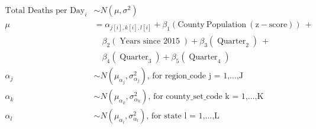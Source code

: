 $$
\begin{aligned}
  \operatorname{Total\ Deaths\ per\ Day}_{i}  &\sim N \left(\mu, \sigma^2 \right) \\
    \mu &=\alpha_{j[i],k[i],l[i]} + \beta_{1}(\operatorname{County\ Population\ (z-score)})\ + \\
&\quad \beta_{2}(\operatorname{Years\ since\ 2015}) + \beta_{3}(\operatorname{Quarter}_{\operatorname{2}})\ + \\
&\quad \beta_{4}(\operatorname{Quarter}_{\operatorname{3}}) + \beta_{5}(\operatorname{Quarter}_{\operatorname{4}}) \\
    \alpha_{j}  &\sim N \left(\mu_{\alpha_{j}}, \sigma^2_{\alpha_{j}} \right)
    \text{, for region\_code j = 1,} \dots \text{,J} \\
    \alpha_{k}  &\sim N \left(\mu_{\alpha_{k}}, \sigma^2_{\alpha_{k}} \right)
    \text{, for county\_set\_code k = 1,} \dots \text{,K} \\
    \alpha_{l}  &\sim N \left(\mu_{\alpha_{l}}, \sigma^2_{\alpha_{l}} \right)
    \text{, for state l = 1,} \dots \text{,L}
\end{aligned}
$$
